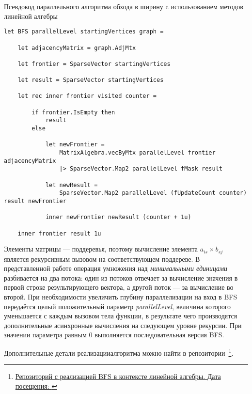 \begin{algorithm}[h]
\caption{Псевдокод параллельного алгоритма обхода в ширину c использованием методов линейной алгебры}
\label{alg:bfs_example}
\begin{lstlisting}[language=pseudoFSharp]
let BFS parallelLevel startingVertices graph =

	let adjacencyMatrix = graph.AdjMtx

    let frontier = SparseVector startingVertices

    let result = SparseVector startingVertices

    let rec inner frontier visited counter =

        if frontier.IsEmpty then
            result
        else

            let newFrontier =
                MatrixAlgebra.vecByMtx parallelLevel frontier adjacencyMatrix
                |> SparseVector.Map2 parallelLevel fMask result

            let newResult =
                SparseVector.Map2 parallelLevel (fUpdateCount counter) result newFrontier

            inner newFrontier newResult (counter + 1u)

    inner frontier result 1u
\end{lstlisting}
\end{algorithm}

Элементы матрицы --- поддеревья, поэтому вычисление элемента $a_{is} \times b_{sj}$ является рекурсивным вызовом на соответствующем поддереве. В представленной работе операция умножения над \textit{минимальными единицами} разбивается на два потока: один из потоков отвечает за вычисление значения в первой строке результирующего вектора, а другой поток --- за вычисление во второй. При необходимости увеличить глубину параллелизации на вход в BFS передаётся целый положительный параметр \textit{parallelLevel}, величина которого уменьшается с каждым вызовом тела функции, в результате чего производятся дополнительные асинхронные вычисления на следующем уровне рекурсии. При значении параметра равным 0 выполняется последовательная версия BFS.
\newline

\noindent Дополнительные детали реализацииалгоритма можно найти в репозитории~\footnote{\href{https://github.com/artem-burashnikov}{Репозиторий с реализацией BFS в контексте линейной алгебры. Дата посещения: }}.